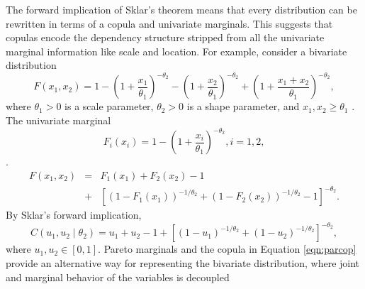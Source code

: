 The forward implication of Sklar's theorem means that every distribution
can be rewritten in terms of a copula and univariate marginals. This
suggests that copulas encode the dependency structure stripped from
all the univariate marginal information like scale and
location. For example, consider a bivariate distribution
\begin{equation}
\label{eqn:bipar}
F(x_1, x_2) = 1 - \left(1 + \frac{x_1}{\theta_1} \right)^{-\theta_2} 
                -\left(1 + \frac{x_2}{\theta_1} \right)^{-\theta_2} 
                +\left(1 + \frac{x_1 + x_2}{\theta_1} \right)^{-\theta_2},
\end{equation}
where $\theta_1 > 0$ is a scale parameter, $\theta_2 > 0$ is a shape
parameter, and $x_1, x_2 \geq \theta_1$ \citep{FreVal1998}. The univariate
marginal 
\begin{equation}
F_i(x_i) = 1 - \left(1 + \frac{x_i}{\theta_1}\right)^{-\theta_2}, i = 1, 2,
\end{equation}
. 
\begin{eqnarray}
F(x_1, x_2) & = & F_1(x_1) + F_2(x_2) - 1 \\ \nonumber
& + & \left[(1 - F_1(x_1))^{-1/\theta_2} + (1 - F_2(x_2))^{-1/\theta_2} - 1 \right]^{-\theta_2}.
\end{eqnarray}
 By Sklar's forward implication, 
\begin{equation}
\label{eqn:parcop}
C(u_1, u_2 \mid \theta_2) = u_1 + u_2 - 1 + [(1 - u_1)^{-1/\theta_2} + (1 - u_2)^{-1/\theta_2}]^{-\theta_2},
\end{equation}
where $u_1, u_2 \in [0, 1]$. 
%
Pareto marginals and the copula in Equation \ref{eqn:parcop} provide an
alternative way for representing the bivariate distribution, where joint
and marginal behavior of the variables is decoupled 

